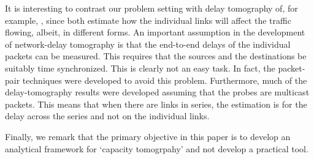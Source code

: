 \documentclass[11pt]{article}
\begin{document}
It is interesting to contrast our problem setting with delay
tomography of, for example, \cite{Coates01,Tsang01}, since both
estimate how the individual links will affect the traffic flowing,
albeit, in different forms.  An important assumption in the
development of network-delay tomography is that the end-to-end delays
of the individual packets can be measured. This requires that the
sources and the destinations be suitably time synchronized. This is
clearly not an easy task. In fact, the packet-pair techniques were
developed to avoid this problem.  Furthermore, much of the
delay-tomography results were developed assuming that the probes are
multicast packets.  This means that when there are links in series,
the estimation is for the delay across the series and not on the
individual links.

Finally, we remark that the primary objective in this paper is to
develop an analytical framework for `capacity tomogrpahy' and not
develop a practical tool. 
\end{document}
